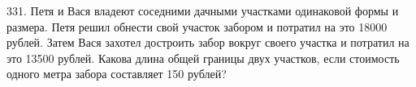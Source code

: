 331. Петя и Вася владеют соседними дачными участками одинаковой формы и размера. Петя решил
обнести свой участок забором и потратил на это 18000 рублей. Затем Вася захотел достроить забор
вокруг своего участка и потратил на это 13500 рублей. Какова длина общей границы двух участков,
если стоимость одного метра забора составляет 150 рублей?\\
